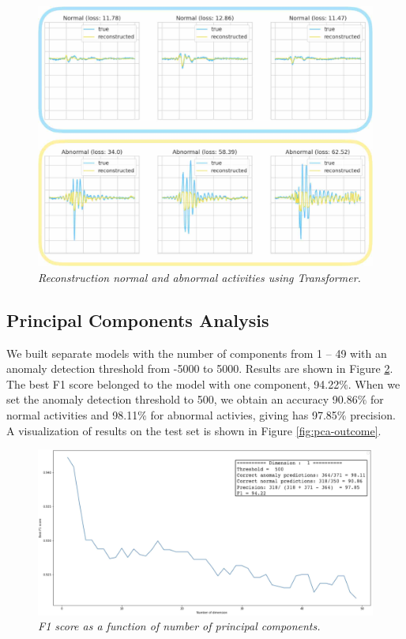 \begin{figure}[H]
  \centering
  \caption[Reconstruction normal and abnormal activities using Transformer.]{\emph{Reconstruction normal and abnormal activities using Transformer.}} \label{fig:transformer_reconstructed_data}
  \includegraphics[scale = 0.22]{figures/transformer_reconstructed_data.jpg}
\end{figure}

\subsection{Principal Components Analysis}
We built separate models with the number of components from 1 -- 49 with an anomaly detection threshold from -5000 to 5000. Results are shown in Figure \ref{fig:pca-f1}. The best F1 score belonged to the model with one component, 94.22$\%$. When we set the anomaly detection threshold to 500, we obtain an accuracy 90.86$\%$ for normal activities and 98.11$\%$ for abnormal activies, giving has 97.85$\%$ precision. A visualization of results on the test set is shown in Figure \ref{fig:pca-outcome}.

\begin{figure}[H]
  \centering
  \caption[F1 score as a function of number of principal components.]{\emph{F1 score as a function of number of principal components.}} \label{fig:pca-f1}
  \includegraphics[scale = 0.13]{figures/pca-f1.jpg}
\end{figure}

